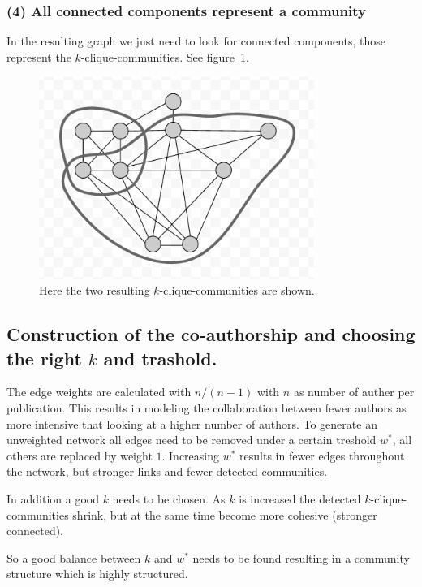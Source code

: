 \documentclass[runningheads,a4paper]{llncs}
\begin{document}
\subsubsection{(4) All connected components represent a community}
In the resulting graph we just need to look for connected components, those represent the $k$-clique-communities. See figure~\ref{fig:result}.

\begin{figure}
\begin{center}
	\includegraphics[width=0.8\textwidth]{result}
		\caption{Here the two resulting $k$-clique-communities are shown.}
		\label{fig:result}
\end{center}
\end{figure}



\subsection{Construction of the co-authorship and choosing the right $k$ and trashold.}
\label{cpm-construction}
The edge weights are calculated with $n/(n-1)$ with $n$ as number of auther per publication.
This results in modeling the collaboration between fewer authors as more intensive that looking at a higher number of authors.  
To generate an unweighted network all edges need to be removed under a certain treshold $w^*$, all others are replaced by weight $1$. Increasing $w^*$ results in fewer edges throughout the network, but stronger links and fewer detected communities.

In addition a good $k$ needs to be chosen. As $k$ is increased the detected $k$-clique-communities shrink, but at the same time become more cohesive (stronger connected).

So a good balance between $k$ and $w^*$ needs to be found resulting in a community structure which is highly structured.
\end{document}

